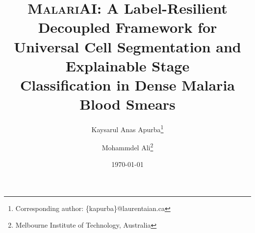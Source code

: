 \documentclass[10pt,twocolumn]{article}
\newcommand{\malariai}{\textsc{MalariAI}}
\begin{document}
\title{%
  \textbf{\malariai: A Label-Resilient Decoupled Framework for\\ Universal Cell Segmentation and Explainable Stage\\
  Classification in Dense Malaria Blood Smears}%
}

\author[1]{Kaysarul Anas Apurba\thanks{Corresponding author: \{kapurba\}@laurentaian.ca}}
\author[2]{Mohammdel Ali\thanks{Melbourne Institute of Technology, Australia}}


\setlength{\affilsep}{0.5em}

\date{\today}

\maketitle
\thispagestyle{empty}
\end{document}

